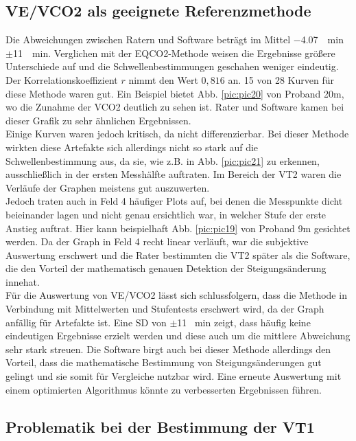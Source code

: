 \subsection{\acrshort{VE}/\acrshort{VCO2} als geeignete Referenzmethode}
%
Die Abweichungen zwischen Ratern und Software beträgt im Mittel \SI{-4,07}{\per\minute} $\pm$\SI{11}{\per\minute}. Verglichen mit der \gls{EQCO2}-Methode weisen die Ergebnisse größere Unterschiede auf und die Schwellenbestimmungen geschahen weniger eindeutig. Der Korrelationskoeffizient $r$ nimmt den Wert $0,816$ an. 15 von 28 Kurven für diese Methode waren gut. Ein Beispiel bietet Abb. \ref{pic:pic20} von Proband 20m, wo die Zunahme der \gls{VCO2} deutlich zu sehen ist. Rater und Software kamen bei dieser Grafik zu sehr ähnlichen Ergebnissen.\\
Einige Kurven waren jedoch kritisch, da nicht differenzierbar. Bei dieser Methode wirkten diese Artefakte sich allerdings nicht so stark auf die Schwellenbestimmung aus, da sie, wie z.B. in Abb. \ref{pic:pic21} zu erkennen, ausschließlich in der ersten Messhälfte auftraten. Im Bereich der VT2 waren die Verläufe der Graphen meistens gut auszuwerten.\\
Jedoch traten auch in Feld 4 häufiger Plots auf, bei denen die Messpunkte dicht beieinander lagen und nicht genau ersichtlich war, in welcher Stufe der erste Anstieg auftrat. Hier kann beispielhaft Abb. \ref{pic:pic19} von Proband 9m gesichtet werden. Da der Graph in Feld 4 recht linear verläuft, war die subjektive Auswertung erschwert und die Rater bestimmten die VT2 später als die Software, die den Vorteil der mathematisch genauen Detektion der Steigungsänderung innehat.\\
Für die Auswertung von \gls{VE}/\gls{VCO2} lässt sich schlussfolgern, dass die Methode in Verbindung mit Mittelwerten und Stufentests erschwert wird, da der Graph anfällig für Artefakte ist. Eine \gls{SD} von $\pm$11 \si{\per\minute} zeigt, dass häufig keine eindeutigen Ergebnisse erzielt werden und diese auch um die mittlere Abweichung sehr stark streuen. Die Software birgt auch bei dieser Methode allerdings den Vorteil, dass die mathematische Bestimmung von Steigungsänderungen gut gelingt und sie somit für Vergleiche nutzbar wird. Eine erneute Auswertung mit einem optimierten Algorithmus könnte zu verbesserten Ergebnissen führen.
%
\subsection{Problematik bei der Bestimmung der VT1}
%
